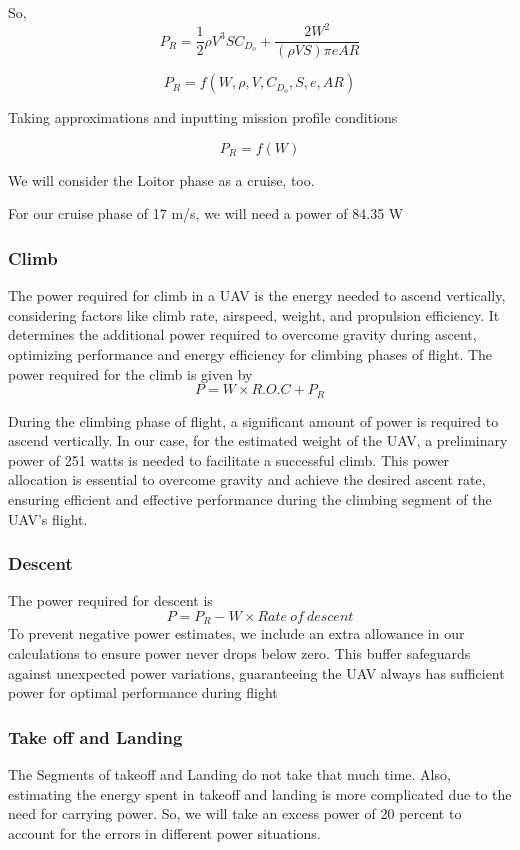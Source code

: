 \documentclass[12 pt]{article}
\begin{document}
So, 
$$ P_R = \frac{1}{2}\rho V^3 S C_{D_o} + \frac{2 W^2}{ (\rho V S) \pi e AR} $$

$$P_R = f(W,\rho,V,C_{D_o},S,e,AR)$$

Taking approximations and inputting mission profile conditions

$$ P_R = f(W) $$

We will consider the Loitor phase as a cruise, too.

For our cruise phase of 17 m/s, we will need a power of 84.35 W 

\subsubsection{Climb }
The power required for climb in a UAV is the energy needed to ascend vertically, considering factors like climb rate, airspeed, weight, and propulsion efficiency. It determines the additional power required to overcome gravity during ascent, optimizing performance and energy efficiency for climbing phases of flight.
The power required for the climb is given by 
$$ P = W \times R.O.C + P_R $$

During the climbing phase of flight, a significant amount of power is required to ascend vertically. In our case, for the estimated weight of the UAV, a preliminary power of 251 watts is needed to facilitate a successful climb. This power allocation is essential to overcome gravity and achieve the desired ascent rate, ensuring efficient and effective performance during the climbing segment of the UAV's flight.

\subsubsection{Descent}
The power required for descent is 
$$ P = P_R - W \times Rate\: of\: descent$$
To prevent negative power estimates, we include an extra allowance in our calculations to ensure power never drops below zero. This buffer safeguards against unexpected power variations, guaranteeing the UAV always has sufficient power for optimal performance during flight

\subsubsection{Take off and Landing}
The Segments of takeoff and Landing do not take that much time. Also, estimating the energy spent in takeoff and landing is more complicated due to the need for carrying power. So, we will take an excess power of 20 percent to account for the errors in different power situations.
\end{document}
